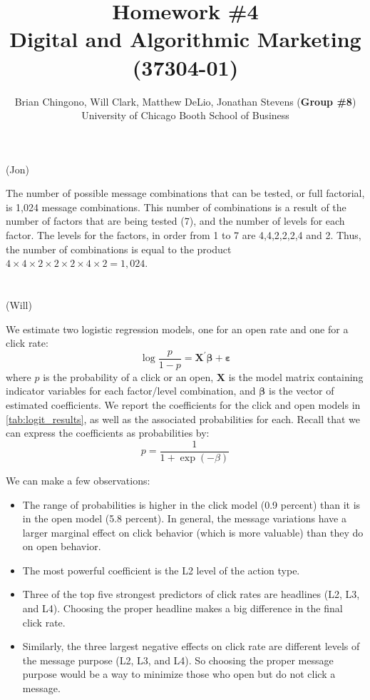 



\title{Homework \#4\\
Digital and Algorithmic Marketing (37304-01)}
\author{
Brian Chingono, Will Clark, Matthew DeLio, Jonathan Stevens (\textbf{Group \#8})\\
University of Chicago Booth School of Business}

\maketitle

\section{} (Jon) %

The number of possible message combinations that can be tested, or full factorial, is 1,024 message combinations. This number of combinations is a result of the number of factors that are being tested (7), and the number of levels for each factor.  The levels for the factors, in order from 1 to 7 are 4,4,2,2,2,4 and 2.  Thus, the number of combinations is equal to the product $4\times4\times2\times2\times2\times4\times2 = 1,024$.    

\section{} (Will) %

We estimate two logistic regression models, one for an open rate and one for a click rate:
\[ \log{\frac{p}{1-p}} = \bm{X}^{\prime} \bm{\beta} + \bm{\varepsilon} \]
where $p$ is the probability of a click or an open, $\bm{X}$ is the model matrix containing indicator variables for each factor/level combination, and $\bm{\beta}$ is the vector of estimated coefficients. We report the coefficients for the click and open models in \cref{tab:logit_results}, as well as the associated probabilities for each. Recall that we can express the coefficients as probabilities by:
\[ p = \frac{1}{1+\exp(-\beta)} \]

We can make a few observations:
\begin{itemize}
\item The range of probabilities is higher in the click model (0.9 percent) than it is in the open model (5.8 percent). In general, the message variations have a larger marginal effect on click behavior (which is more valuable) than they do on open behavior.
\item The most powerful coefficient is the L2 level of the action type. 
\item Three of the top five strongest predictors of click rates are headlines (L2, L3, and L4). Choosing the proper headline makes a big difference in the final click rate.
\item Similarly, the three largest negative effects on click rate are different levels of the message purpose (L2, L3, and L4). So choosing the proper message purpose would be a way to minimize those who open but do not click a message.
\end{itemize}

